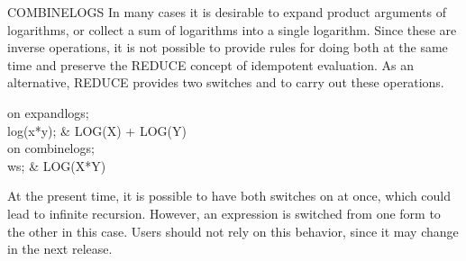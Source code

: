 \begin{Switch}{COMBINELOGS}
In many cases it is desirable to expand product arguments of logarithms,
or collect a sum of logarithms into a single logarithm.  Since these are
inverse operations, it is not possible to provide rules for doing both at
the same time and preserve the REDUCE concept of idempotent evaluation.
As an alternative, REDUCE provides two switches  and
 to carry out these operations.
\begin{Examples}
on expandlogs; \\
log(x*y); & LOG(X) + LOG(Y) \\
on combinelogs; \\
ws; & LOG(X*Y)
\end{Examples}

\begin{Comments}
At the present time, it is possible to have both switches on at once,
which could lead to infinite recursion.  However, an expression is
switched from one form to the other in this case.  Users should not rely
on this behavior, since it may change in the next release.
\end{Comments}

\end{Switch}


